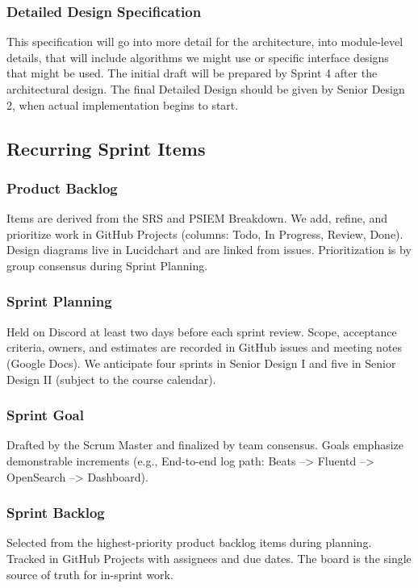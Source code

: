\subsubsection{Detailed Design Specification}
This specification will go into more detail for the architecture, into module-level details, that will include algorithms we might use or specific interface designs that might be used. The initial draft will be prepared by Sprint 4 after the architectural design. The final Detailed Design should be given by Senior Design 2, when actual implementation begins to start.

\subsection{Recurring Sprint Items}
\subsubsection{Product Backlog}
Items are derived from the SRS and PSIEM Breakdown. We add, refine, and prioritize work
in GitHub Projects (columns: Todo, In Progress, Review, Done). Design diagrams live in
Lucidchart and are linked from issues. Prioritization is by group consensus during Sprint Planning.

\subsubsection{Sprint Planning}
Held on Discord at least two days before each sprint review. Scope, acceptance criteria, owners,
and estimates are recorded in GitHub issues and meeting notes (Google Docs). We anticipate four
sprints in Senior Design I and five in Senior Design II (subject to the course calendar).

\subsubsection{Sprint Goal}
Drafted by the Scrum Master and finalized by team consensus. Goals emphasize demonstrable
increments (e.g., End-to-end log path: Beats --> Fluentd --> OpenSearch --> Dashboard).

\subsubsection{Sprint Backlog}
Selected from the highest-priority product backlog items during planning. Tracked in GitHub
Projects with assignees and due dates. The board is the single source of truth for in-sprint work.

